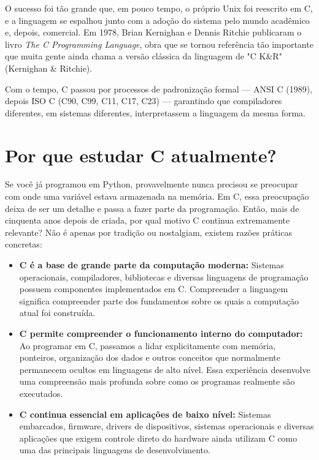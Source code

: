 \documentclass[12pt,a4paper,oneside]{extreport}
\begin{document}
O sucesso foi tão grande que, em pouco tempo, o próprio Unix foi reescrito em C, e a linguagem se espalhou junto com a adoção do sistema pelo mundo acadêmico e, depois, comercial. Em 1978, Brian Kernighan e Dennis Ritchie publicaram o livro \textit{The C Programming Language}, obra que se tornou referência tão importante que muita gente ainda chama a versão clássica da linguagem de "C K\&R" (Kernighan \& Ritchie).

Com o tempo, C passou por processos de padronização formal — ANSI C (1989), depois ISO C (C90, C99, C11, C17, C23) — garantindo que compiladores diferentes, em sistemas diferentes, interpretassem a linguagem da mesma forma.

\section{Por que estudar C atualmente?}

Se você já programou em Python, provavelmente nunca precisou se preocupar com onde uma variável estava armazenada na memória. Em C, essa preocupação deixa de ser um detalhe e passa a fazer parte da programação. Então, mais de cinquenta anos depois de criada, por qual motivo C continua extremamente relevante? 
Não é apenas por tradição ou nostalgiam, existem razões práticas concretas:


\begin{itemize}
    \item[--] \textbf{C é a base de grande parte da computação moderna:} Sistemas operacionais, compiladores, bibliotecas e diversas linguagens de programação possuem componentes implementados em C. Compreender a linguagem significa compreender parte dos fundamentos sobre os quais a computação atual foi construída.
    \item[--] \textbf{C permite compreender o funcionamento interno do computador:} Ao programar em C, passamos a lidar explicitamente com memória, ponteiros, organização dos dados e outros conceitos que normalmente permanecem ocultos em linguagens de alto nível. Essa experiência desenvolve uma compreensão mais profunda sobre como os programas realmente são executados.
    \item[--] \textbf{C continua essencial em aplicações de baixo nível:} Sistemas embarcados, firmware, drivers de dispositivos, sistemas operacionais e diversas aplicações que exigem controle direto do hardware ainda utilizam C como uma das principais linguagens de desenvolvimento.
\end{itemize}
\end{document}
